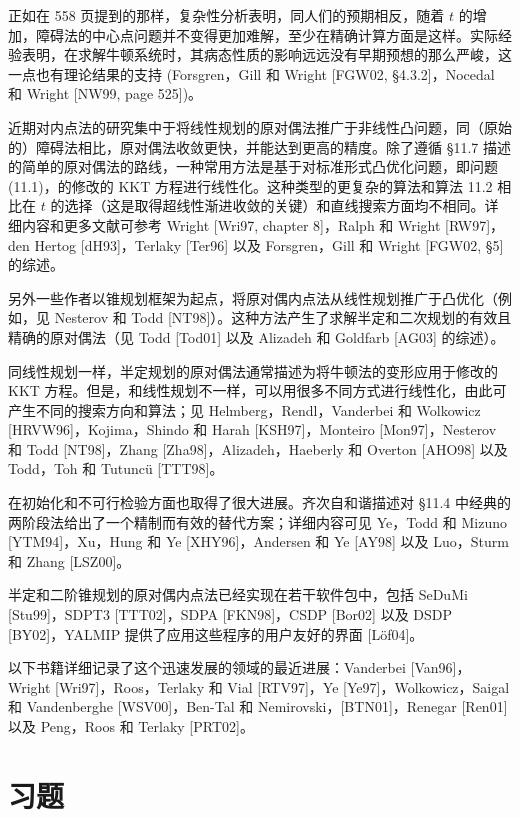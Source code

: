 \documentclass[UTF8,12pt,a4paper,fontset=fandol]{ctexart}
\begin{document}
正如在 558 页提到的那样，复杂性分析表明，同人们的预期相反，随着 $t$ 的增加，障碍法的中心点问题并不变得更加难解，至少在精确计算方面是这样。实际经验表明，在求解牛顿系统时，其病态性质的影响远远没有早期预想的那么严峻，这一点也有理论结果的支持 (Forsgren，Gill 和 Wright [FGW02, \S4.3.2]，Nocedal 和 Wright [NW99, page 525])。

近期对内点法的研究集中于将线性规划的原对偶法推广于非线性凸问题，同（原始的）障碍法相比，原对偶法收敛更快，并能达到更高的精度。除了遵循 \S11.7 描述的简单的原对偶法的路线，一种常用方法是基于对标准形式凸优化问题，即问题 (11.1)，的修改的 KKT 方程进行线性化。这种类型的更复杂的算法和算法 11.2 相比在 $t$ 的选择（这是取得超线性渐进收敛的关键）和直线搜索方面均不相同。详细内容和更多文献可参考 Wright [Wri97, chapter 8]，Ralph 和 Wright [RW97]，den Hertog [dH93]，Terlaky [Ter96] 以及 Forsgren，Gill 和 Wright [FGW02, \S5] 的综述。

另外一些作者以锥规划框架为起点，将原对偶内点法从线性规划推广于凸优化（例如，见 Nesterov 和 Todd [NT98]）。这种方法产生了求解半定和二次规划的有效且精确的原对偶法（见 Todd [Tod01] 以及 Alizadeh 和 Goldfarb [AG03] 的综述）。

同线性规划一样，半定规划的原对偶法通常描述为将牛顿法的变形应用于修改的 KKT 方程。但是，和线性规划不一样，可以用很多不同方式进行线性化，由此可产生不同的搜索方向和算法；见 Helmberg，Rendl，Vanderbei 和 Wolkowicz [HRVW96]，Kojima，Shindo 和 Harah [KSH97]，Monteiro [Mon97]，Nesterov 和 Todd [NT98]，Zhang [Zha98]，Alizadeh，Haeberly 和 Overton [AHO98] 以及 Todd，Toh 和 Tutuncü [TTT98]。

在初始化和不可行检验方面也取得了很大进展。齐次自和谐描述对 \S11.4 中经典的两阶段法给出了一个精制而有效的替代方案；详细内容可见 Ye，Todd 和 Mizuno [YTM94]，Xu，Hung 和 Ye [XHY96]，Andersen 和 Ye [AY98] 以及 Luo，Sturm 和 Zhang [LSZ00]。

半定和二阶锥规划的原对偶内点法已经实现在若干软件包中，包括 SeDuMi [Stu99]，SDPT3 [TTT02]，SDPA [FKN98]，CSDP [Bor02] 以及 DSDP [BY02]，YALMIP 提供了应用这些程序的用户友好的界面 [Löf04]。

以下书籍详细记录了这个迅速发展的领域的最近进展：Vanderbei [Van96]，Wright [Wri97]，Roos，Terlaky 和 Vial [RTV97]，Ye [Ye97]，Wolkowicz，Saigal 和 Vandenberghe [WSV00]，Ben-Tal 和 Nemirovski，[BTN01]，Renegar [Ren01] 以及 Peng，Roos 和 Terlaky [PRT02]。

\section*{习题}
\end{document}
